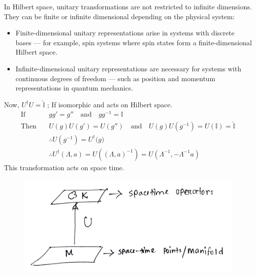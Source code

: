 \documentclass[14pt]{article} %
\begin{document}
\begin{tcolorbox}[ title=\textbf{Note: Dimension of Unitary Transformation in Hilbert Space}]
In Hilbert space, unitary transformations are not restricted to infinite dimensions. They can be finite or infinite dimensional depending on the physical system:

\begin{itemize}
    \item Finite-dimensional unitary representations arise in systems with discrete bases — for example, spin systems where spin states form a finite-dimensional Hilbert space.
    \item Infinite-dimensional unitary representations are necessary for systems with continuous degrees of freedom — such as position and momentum representations in quantum mechanics.
\end{itemize}
\end{tcolorbox}
Now, $U^\dagger U = \hat{\mathbb{I}}$ ; If isomorphic and acts on Hilbert space.
\begin{align*}
    \text{If}\quad &gg'=g'' \quad \text{and} \quad gg^{-1}=\mathbb{I} \\
    \text{Then} \quad & U(g)U(g') = U(g'') \quad \text{and} \quad U(g)U(g^{-1}) = U(\mathbb{I}) = \hat{\mathbb{I}} \\
    &\therefore U(g^{-1}) = U^{\dagger}{(g})\\
    &\therefore U^\dagger(\Lambda,a)=U\left((\Lambda,a)^{-1}\right)=U(\Lambda^{-1},-\Lambda^{-1}a)  \tag{4.5} \label{eq:4.5}
\end{align*}
This transformation acts on space time.
\begin{figure}[H]
\centering
\includegraphics[width=0.6\linewidth]{L1_1.jpg}
\caption*{}
\end{figure}
\end{document}

